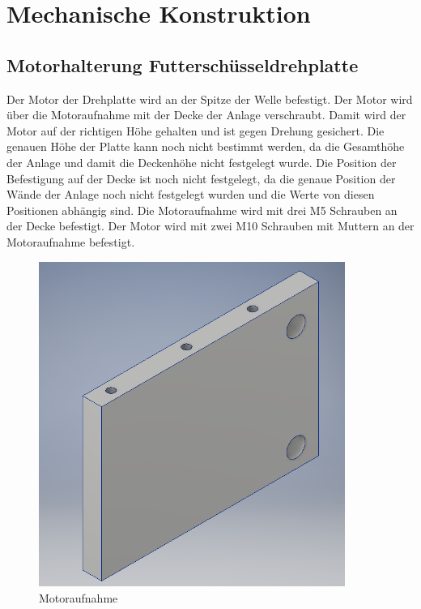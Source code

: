 \section{Mechanische Konstruktion}
\subsection{Motorhalterung Futterschüsseldrehplatte}
Der Motor der Drehplatte wird an der Spitze der Welle befestigt. Der Motor wird über die Motoraufnahme mit der Decke der Anlage verschraubt. Damit wird der Motor auf der richtigen Höhe gehalten und ist gegen Drehung gesichert. Die genauen Höhe der Platte kann noch nicht bestimmt werden, da die Gesamthöhe der Anlage und damit die Deckenhöhe nicht festgelegt wurde. Die Position der Befestigung auf der Decke ist noch nicht festgelegt, da die genaue Position der Wände der Anlage noch nicht festgelegt wurden und die Werte von diesen Positionen abhängig sind. Die Motoraufnahme wird mit drei M5 Schrauben an der Decke befestigt. Der Motor wird mit zwei M10 Schrauben mit Muttern an der Motoraufnahme befestigt.
\begin{figure}[H] 
\begin{center}
\includegraphics[width=10cm]{Bilder/Inventor/Motoraufnahme}
\caption{Motoraufnahme}
\label{Motoraufnahme}
\end{center}
\end{figure}
\newpage
